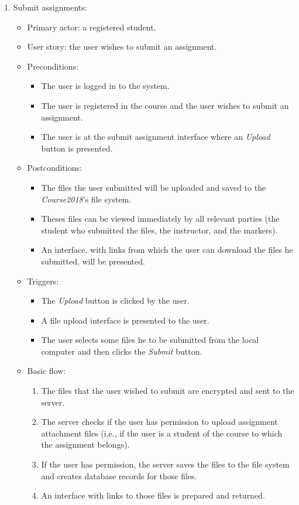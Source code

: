 \begin{enumerate}
\item Submit assignments:
\begin{itemize}
    \item Primary actor: a registered student.
    \item User story: the user wishes to submit an assignment.
    \item Preconditions:
        \begin{itemize}
            \item The user is logged in to the system.
            \item The user is registered in the course and the user wishes to
                submit an assignment.
            \item The user is at the submit assignment interface where an
                \emph{Upload} button is presented.
        \end{itemize}
    \item Postconditions:
        \begin{itemize}
            \item The files the user submitted will be uploaded and saved to the
                \emph{Course2018}'s file system.
            \item Theses files can be viewed immediately by all relevant parties
                (the student who submitted the files, the instructor,
                and the markers).
            \item An interface, with links from which the user can
                download the files he submitted, will be presented.
        \end{itemize}
    \item Triggers:
        \begin{itemize}
            \item The \emph{Upload} button is clicked by the user.
            \item A file upload interface is presented to the user.
            \item The user selects some files he to be submitted from the 
                local computer and then clicks the \emph{Submit} button.
        \end{itemize}
    \item Basic flow:
        \begin{enumerate}
            \item The files that the user wished to submit are encrypted and
                sent to the server.
            \item The server checks if the user has permission to upload
                assignment attachment files (i.e., if the user is a
                student of the course to which the assignment belongs).
            \item If the user has permission, the server saves the files to the
                file system and creates database records for those files.
            \item An interface with links to those files is prepared and
                returned.
        \end{enumerate}
\end{itemize}


\end{enumerate}
